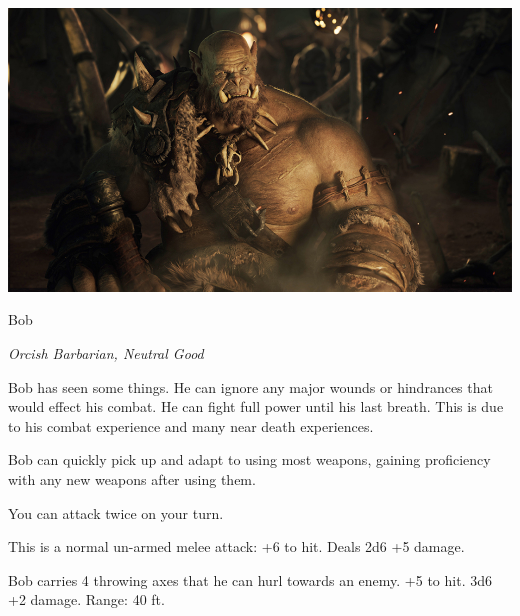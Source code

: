 \begin{center}
	\includegraphics[width=0.7\linewidth]{img/WoW/bob.jpg}
\end{center}

\begin{monsterbox}{Bob}
	\begin{hangingpar}
		\textit{Orcish Barbarian, Neutral Good}
	\end{hangingpar}
	\dndline%
	\basics[%
	armorclass = 17,
	hitpoints  = 151,
	speed      = 30 ft
	]
	\dndline%
	\stats[
	STR = \stat{20}, %
	DEX = \stat{18},
	CON = \stat{17},
	INT = \stat{16},
	WIS = \stat{15},
	CHA = \stat{13}
	]
	\dndline%
	\details[%
	languages = {Common, Dwarvish, Orc},
	challenge = 9
	]
	\dndline%
	\begin{monsteraction}
		Bob has seen some things. He can ignore any major wounds or hindrances that would effect his combat. He can fight full power until his last breath. This is due to his combat experience and many near death experiences.
	\end{monsteraction}	
	\begin{monsteraction}
		Bob can quickly pick up and adapt to using most weapons, gaining proficiency with any new weapons after using them.
	\end{monsteraction}	
	\begin{monsteraction}
		You can attack twice on your turn.
	\end{monsteraction}
	\begin{monsteraction}[Melee]
		This is a normal un-armed melee attack: +6 to hit. Deals 2d6 +5 damage.
	\end{monsteraction}
	\begin{monsteraction}
		Bob carries 4 throwing axes that he can hurl towards an enemy. +5 to hit. 3d6 +2 damage. Range: 40 ft.
	\end{monsteraction}
	
\end{monsterbox}


